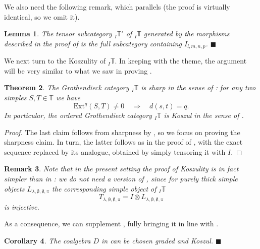 \documentclass[11pt]{article}
\theoremstyle{plain}
\newtheorem{lemma}{Lemma}[section]
\newtheorem{corollary}[lemma]{Corollary}
\newtheorem{theorem}[lemma]{Theorem}
\theoremstyle{nonumberplain}
\theoremstyle{plain}
\newtheorem{remark}[lemma]{Remark}
\numberwithin{equation}{section}
\theoremstyle{nonumberplain}
\newtheorem{proof}{Proof}
\newcommand\bT{{\mathbb T}}
\newcommand\1{{\bf 1}}
\newcommand{\qedhere}{\mbox{}\hfill\ensuremath{\blacksquare}}
\begin{document}
We also need the following remark, which parallels \cite[Lemma 2.19]{us0} (the proof is virtually identical, so we omit it).

\begin{lemma}\label{le:fullonx}
  The tensor subcategory ${}_I\bT'$ of ${}_I\bT$ generated by the morphisms described in the proof of  is the full subcategory containing $I_{l,m,n,p}$.  \qedhere
\end{lemma}

We next turn to the Koszulity of ${}_I\bT$. In keeping with the theme, the argument will be very similar to what we saw in proving . %

\begin{theorem}\label{th:ikosz}
  The Grothendieck category ${}_I\bT$ is sharp in the sense of : for any two simples $S,T\in {\bT}$ we have
  \begin{equation*}
    \mathrm{Ext}^q(S,T)\ne 0\quad \Rightarrow\quad  d(s,t)=q.
  \end{equation*}
  In particular, the ordered Grothendieck category ${}_I\bT$ is Koszul in the sense of .
\end{theorem}
\begin{proof}
The last claim follows from sharpness by , so we focus on proving the sharpness claim. In turn, the latter follows as in the proof of , with the exact sequence  replaced by its analogue, obtained by simply tensoring it with $I$.   
\end{proof}


\begin{remark}
  Note that in the present setting the proof of Koszulity is in fact simpler than in : we do not need a version of , since for purely thick simple objects $L_{\lambda,\emptyset,\emptyset,\pi}$ the corresponding simple object of ${}_{I}\bT$
  \begin{equation*}
    T_{\lambda,\emptyset,\emptyset,\pi} = I\otimes L_{\lambda,\emptyset,\emptyset,\pi}
  \end{equation*}
  is injective. 
\end{remark}

As a consequence, we can supplement , fully bringing it in line with . 

\begin{corollary}\label{cor.dgradedkoszul}
The coalgebra $D$ in  can be chosen graded and Koszul. 
  \qedhere
\end{corollary}
\end{document}
